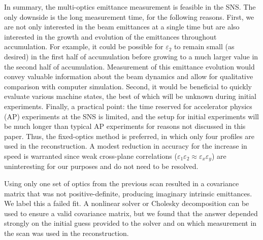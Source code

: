 In summary, the multi-optics emittance measurement is feasible in the SNS. The only downside is the long measurement time, for the following reasons. First, we are not only interested in the beam emittances at a single time but are also interested in the growth and evolution of the emittances throughout accumulation. For example, it could be possible for $\varepsilon_2$ to remain small (as desired) in the first half of accumulation before growing to a much larger value in the second half of accumulation. Measurement of this emittance evolution would convey valuable information about the beam dynamics and allow for qualitative comparison with computer simulation. Second, it would be beneficial to quickly evaluate various machine states, the best of which will be unknown during initial experiments. Finally, a practical point: the time reserved for accelerator physics (AP) experiments at the SNS is limited, and the setup for initial experiments will be much longer than typical AP experiments for reasons not discussed in this paper. Thus, the fixed-optics method is preferred, in which only four profiles are used in the reconstruction. A modest reduction in accuracy for the increase in speed is warranted since weak cross-plane correlations ($\varepsilon_1 \varepsilon_2 \approx \varepsilon_x \varepsilon_y$) are uninteresting for our purposes and do not need to be resolved. 

Using only one set of optics from the previous scan resulted in a covariance matrix that was not positive-definite, producing imaginary intrinsic emittances. We label this a failed fit. A nonlinear solver \cite{Raimondi1993} or Cholesky decomposition \cite{Agapov2007} can be used to ensure a valid covariance matrix, but we found that the answer depended strongly on the initial guess provided to the solver and on which measurement in the scan was used in the reconstruction.

